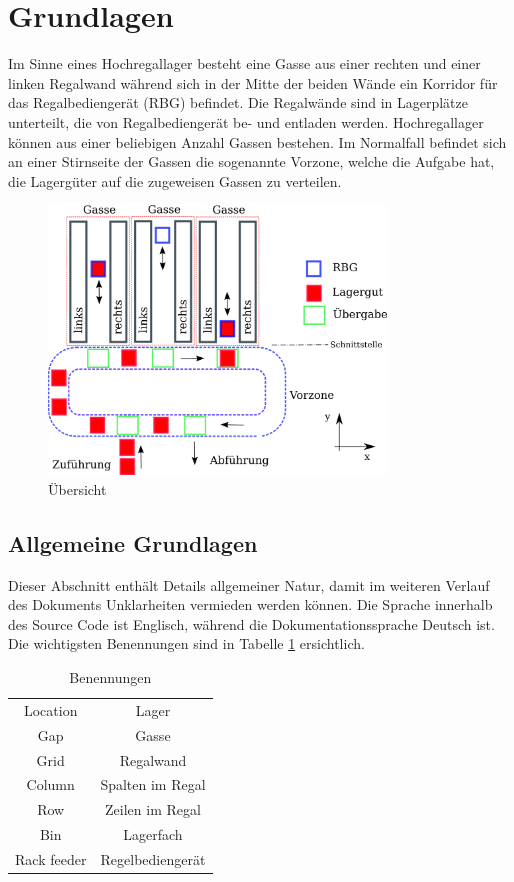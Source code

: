 \section{Grundlagen}
Im Sinne eines Hochregallager besteht eine Gasse aus einer rechten und einer linken Regalwand während sich in der Mitte der beiden Wände ein Korridor für das Regalbediengerät (RBG) befindet. Die Regalwände sind in Lagerplätze unterteilt, die von Regalbediengerät be- und entladen werden. Hochregallager können aus einer beliebigen Anzahl Gassen bestehen. Im Normalfall befindet sich an einer Stirnseite der Gassen die sogenannte Vorzone, welche die Aufgabe hat, die Lagergüter auf die zugeweisen Gassen zu verteilen. 
%
\begin{figure}[H]
  \begin{center}
    \includegraphics[width=0.8\textwidth]{images/uebersicht.png}
    \caption{Übersicht}
    \label{fig:overview}
  \end{center}
\end{figure}
%

%
\subsection{Allgemeine Grundlagen}
Dieser Abschnitt enthält Details allgemeiner Natur, damit im weiteren Verlauf des Dokuments Unklarheiten vermieden werden können. Die Sprache innerhalb des Source Code ist Englisch, während die Dokumentationssprache Deutsch ist. Die wichtigsten Benennungen sind in Tabelle \ref{tab:desc} ersichtlich.
%
\begin{table}[H]
  \caption{Benennungen}
  \label{tab:desc}

  \begin{center}
    \begin{tabular}{cc}
       Location & Lager\\
       Gap & Gasse\\
       Grid & Regalwand \\
       Column & Spalten im Regal \\
       Row & Zeilen im Regal \\
       Bin & Lagerfach \\
       Rack feeder & Regelbediengerät \\
    \end{tabular}
  \end{center}
\end{table}
%
